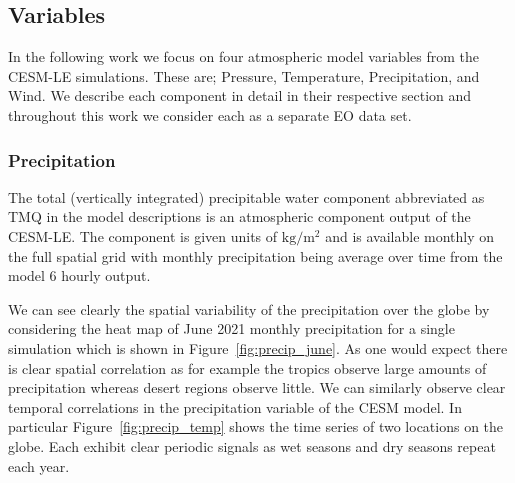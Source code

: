  
 \subsection{Variables \label{ssec:variables}}
 In the following work we  focus on four atmospheric model variables from the  CESM-LE simulations.
 These are; Pressure, Temperature, Precipitation, and Wind.
 We describe each component in detail in their respective section and throughout this work we consider each as a separate EO data set. 

\subsubsection{Precipitation \label{sssec:precip}}
The total (vertically integrated) precipitable water component abbreviated as TMQ in the model descriptions is an atmospheric component output of the CESM-LE.
The component is given units of $\si{\kilogram\per\metre\squared} $ and is available monthly on the full spatial grid with monthly precipitation being average over time from the model 6 hourly output. 

We can see clearly the spatial variability of the precipitation over the globe by considering the heat map of June 2021 monthly precipitation for a single simulation which is shown in Figure~\ref{fig:precip_june}.
As one would expect there is clear spatial correlation as for example the tropics observe large amounts of precipitation whereas desert regions observe little.
We can similarly observe clear temporal correlations in the precipitation variable of the CESM model.
In particular Figure~\ref{fig:precip_temp} shows the time series of two locations on the globe.
Each exhibit clear periodic signals as wet seasons and dry seasons repeat each year.

